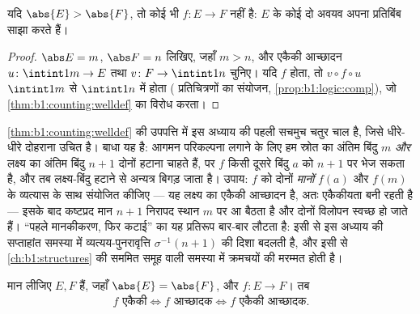 \begin{corollary}[कबूतरखाना सिद्धांत]\label{cor:b1:counting:pigeonhole}
यदि $\abs{E} > \abs{F}$, तो कोई भी  $f \colon E \to F$  नहीं
है: $E$ के कोई दो अवयव अपना प्रतिबिंब साझा करते हैं।
\end{corollary}

\begin{proof}
$\abs E = m$, $\abs F = n$ लिखिए, जहाँ $m > n$, और एकैकी आच्छादन $u \colon
\intint1m \to E$ तथा $v \colon F \to \intint1n$ चुनिए। यदि $f$  होता,
तो $v \circ f \circ u$ $\intint1m$ से $\intint1n$ में   होता
( प्रतिचित्रणों का संयोजन, \cref{prop:b1:logic:comp}), जो
\cref{thm:b1:counting:welldef} का विरोध करता।
\end{proof}

\begin{remark}\label{rem:b1:counting:swapinterlude}
\cref{thm:b1:counting:welldef} की उपपत्ति में इस अध्याय की पहली सचमुच चतुर
चाल है, जिसे धीरे-धीरे दोहराना उचित है। बाधा यह है: आगमन परिकल्पना लगाने के
लिए हम स्रोत का अंतिम बिंदु $m$ \emph{और} लक्ष्य का अंतिम बिंदु $n+1$ दोनों
हटाना चाहते हैं, पर $f$ किसी दूसरे बिंदु $a$ को $n + 1$ पर भेज सकता है, और
तब लक्ष्य-बिंदु हटाने से  अन्यत्र बिगड़ जाता है। उपाय: $f$ को
दोनों \emph{मानों} $f(a)$ और $f(m)$ के व्यत्यास के साथ संयोजित कीजिए --- यह
लक्ष्य का एकैकी आच्छादन है, अतः एकैकीयता बनी रहती है --- इसके बाद कष्टप्रद
मान $n + 1$ निरापद स्थान $m$ पर आ बैठता है और दोनों विलोपन स्वच्छ हो जाते
हैं। ``पहले मानकीकरण, फिर कटाई'' का यह प्रतिरूप बार-बार लौटता है: इसी से इस
अध्याय की सप्ताहांत समस्या में व्यत्यय-पुनरावृत्ति $\sigma^{-1}(n+1)$ की
दिशा बदलती है, और इसी से \cref{ch:b1:structures} की सममित समूह वाली समस्या
में क्रमचयों की मरम्मत होती है।
\end{remark}

\begin{proposition}[एकैकी, आच्छादक प्रतिचित्रण और गणनांक]\label{prop:b1:counting:injsur}
मान लीजिए $E, F$  हैं, जहाँ $\abs{E} = \abs{F}$, और $f \colon
E \to F$। तब
\[
f \text{ एकैकी} \iff f \text{ आच्छादक} \iff f \text{ एकैकी आच्छादक}.
\]
\end{proposition}

